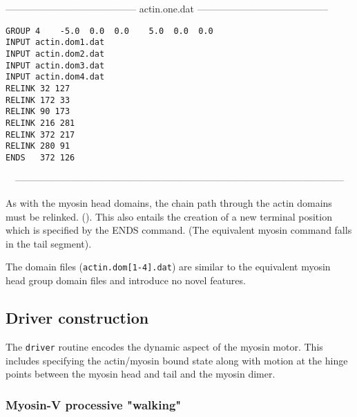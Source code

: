\begin{singlespace}
-----------------------------------------
actin.one.dat
-----------------------------------------
\begin{verbatim}
GROUP 4    -5.0  0.0  0.0    5.0  0.0  0.0
INPUT actin.dom1.dat
INPUT actin.dom2.dat
INPUT actin.dom3.dat
INPUT actin.dom4.dat
RELINK 32 127
RELINK 172 33
RELINK 90 173
RELINK 216 281
RELINK 372 217
RELINK 280 91
ENDS   372 126
\end{verbatim}
\ \ ------------------------------------------------------------------------------------------------------
\end{singlespace}

As with the myosin head domains, the chain path through the actin domains must be relinked.
().
This also entails the creation of a new terminal position which is specified by the ENDS 
command.   (The equivalent myosin command falls in the tail segment).

The domain files ({\tt actin.dom[1-4].dat}) are similar to the equivalent myosin head
group domain files and introduce no novel features.

\subsection{Driver construction}

The {\tt driver} routine encodes the dynamic aspect of the myosin motor.
This includes specifying the actin/myosin bound state along with motion
at the hinge points between the myosin head and tail and the myosin dimer.

\subsubsection{Myosin-V processive "walking"}

